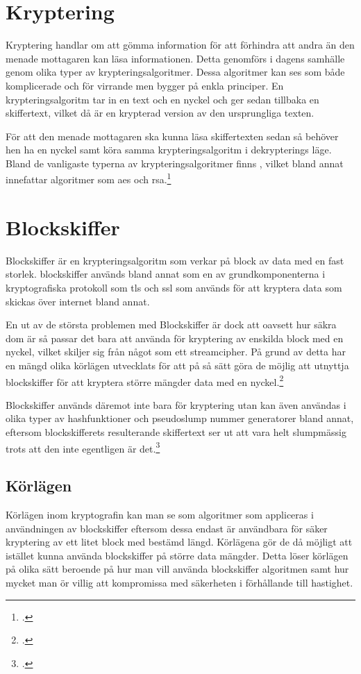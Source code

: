 
\section{Kryptering}
Kryptering handlar om att gömma information för att förhindra att andra än den menade mottagaren kan läsa informationen.
Detta genomförs i dagens samhälle genom olika typer av krypteringsalgoritmer. Dessa algoritmer kan ses som både komplicerade
och för virrande men bygger på enkla principer. En krypteringsalgoritm tar in en text och en nyckel och ger sedan tillbaka en
skiffertext, vilket då är en krypterad version av den ursprungliga texten.

För att den menade mottagaren ska kunna läsa skiffertexten sedan så behöver hen ha en nyckel samt köra samma krypteringsalgoritm
i dekrypterings läge. Bland de vanligaste typerna av krypteringsalgoritmer finns ,
vilket bland annat innefattar algoritmer som \acrshort{aes} och \gls{rsa}.\footcite{kryptering}

\section{Blockskiffer}
\label{sec:blockskiffer}
Blockskiffer är en krypteringsalgoritm som verkar på block av data med en fast storlek.
blockskiffer används bland annat som en av grundkomponenterna i kryptografiska protokoll som \acrfull{tls} och \acrfull{ssl}
som används för att kryptera data som skickas över internet bland annat.

En ut av de största problemen med Blockskiffer är dock att oavsett hur säkra dom är så passar det bara att använda
för kryptering av enskilda block med en nyckel, vilket skiljer sig från något som ett \gls{streamcipher}.
På grund av detta har en mängd olika körlägen utvecklats för att på så sätt göra de möjlig att utnyttja
blockskiffer för att kryptera större mängder data med en nyckel.\footcite{blockskiffer-ref}

Blockskiffer används däremot inte bara för kryptering utan kan även användas i olika typer av \gls{hashfunktion}er
och \gls{pseudoslump} nummer generatorer bland annat, eftersom blockskifferets resulterande skiffertext ser ut att vara helt slumpmässig
trots att den inte egentligen är det.\footcite{blockskiffer-ref}

\subsection{Körlägen}
Körlägen inom kryptografin kan man se som algoritmer som appliceras i användningen av
blockskiffer eftersom dessa endast är användbara för säker kryptering av ett litet block med bestämd längd.
Körlägena gör de då möjligt att istället kunna använda blockskiffer på större data mängder.
Detta löser körlägen på olika sätt beroende på hur man vill använda blockskiffer algoritmen samt hur
mycket man ör villig att kompromissa med säkerheten i förhållande till hastighet.

